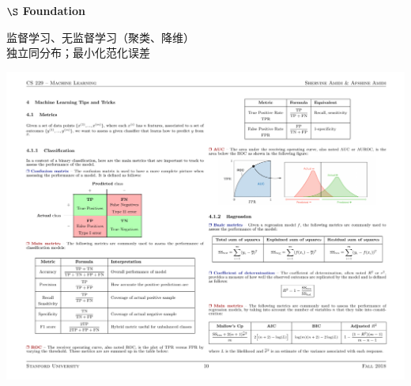\documentclass[a4paper,landscape]{article}
\begin{document}
\clearpage

\begin{tiny}
	\renewcommand{\section}[1]{{$\S$ \scriptsize\bfseries #1}}
	\renewcommand{\subsection}[1]{{\scriptsize\bfseries #1}}
	\begin{multicols}{4}
		\section{Foundation}

		\begin{minipage}[]{0.58\linewidth}
			监督学习、无监督学习（聚类、降维）\\独立同分布；最小化范化误差
		\end{minipage}
		\begin{minipage}[p]{0.38\linewidth}
			\includegraphics[width=\linewidth]{sensitivity.pdf}
		\end{minipage}


\end{multicols}
\end{tiny}
\end{document}
